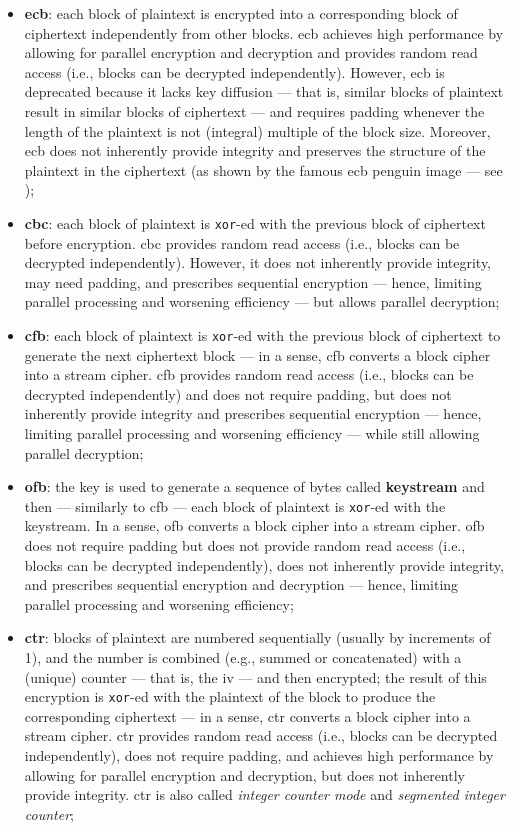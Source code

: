 \begin{itemize}
	\item \textbf{\gls{ecb}}: each block of plaintext is encrypted into a corresponding block of ciphertext independently from other blocks. \gls{ecb} achieves high performance by allowing for parallel encryption and decryption and provides random read access (i.e., blocks can be decrypted independently). However, \gls{ecb} is deprecated because it lacks key diffusion --- that is, similar blocks of plaintext result in similar blocks of ciphertext --- and requires padding whenever the length of the plaintext is not (integral) multiple of the block size. Moreover, \gls{ecb} does not inherently provide integrity and preserves the structure of the plaintext in the ciphertext (as shown by the famous \gls{ecb} penguin image --- see );
	\item \textbf{\gls{cbc}}: each block of plaintext is \texttt{xor}-ed with the previous block of ciphertext before encryption. \gls{cbc} provides random read access (i.e., blocks can be decrypted independently). However, it does not inherently provide integrity, may need padding, and prescribes sequential encryption --- hence, limiting parallel processing and worsening efficiency --- but allows parallel decryption;
	\item \textbf{\gls{cfb}}: each block of plaintext is \texttt{xor}-ed with the previous block of ciphertext to generate the next ciphertext block --- in a sense, \gls{cfb} converts a block cipher into a stream cipher. \gls{cfb} provides random read access (i.e., blocks can be decrypted independently) and does not require padding, but does not inherently provide integrity and prescribes sequential encryption --- hence, limiting parallel processing and worsening efficiency --- while still allowing parallel decryption;
	\item \textbf{\gls{ofb}}: the key is used to generate a sequence of bytes called \textbf{keystream} and then --- similarly to \gls{cfb} --- each block of plaintext is \texttt{xor}-ed with the keystream. In a sense, \gls{ofb} converts a block cipher into a stream cipher. \gls{ofb} does not require padding but does not provide random read access (i.e., blocks can be decrypted independently), does not inherently provide integrity, and prescribes sequential encryption and decryption --- hence, limiting parallel processing and worsening efficiency;
	\item \textbf{\gls{ctr}}: blocks of plaintext are numbered sequentially (usually by increments of 1), and the number is combined (e.g., summed or concatenated) with a (unique) counter --- that is, the \gls{iv} --- and then encrypted; the result of this encryption is \texttt{xor}-ed with the plaintext of the block to produce the corresponding ciphertext --- in a sense, \gls{ctr} converts a block cipher into a stream cipher. \gls{ctr} provides random read access (i.e., blocks can be decrypted independently), does not require padding, and achieves high performance by allowing for parallel encryption and decryption, but does not inherently provide integrity. \gls{ctr} is also called \textit{integer counter mode} and \textit{segmented integer counter};

\end{itemize}

